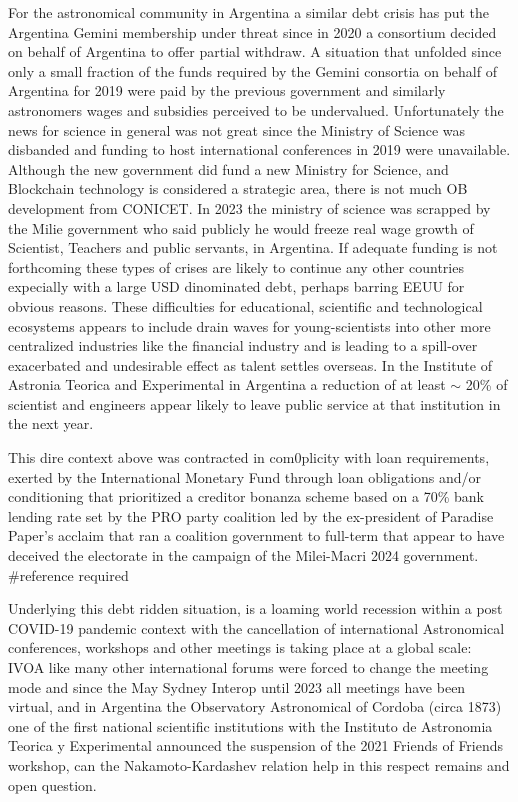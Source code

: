 \documentclass[final,5p,times,twocolumn,authoryear]{elsarticle}
\begin{document}
For the astronomical community in Argentina a similar debt crisis has put the Argentina Gemini membership under threat since in 2020 a consortium decided on behalf of Argentina to offer partial withdraw. A situation that unfolded since only a small fraction of the funds required by the Gemini consortia on behalf of Argentina for 2019 were paid by the previous government and similarly astronomers wages and subsidies perceived to be undervalued. Unfortunately the news for science in general was not great since the Ministry of Science was disbanded and funding to host international conferences in 2019 were unavailable. Although the new government did fund a new Ministry for Science, and Blockchain technology is considered a strategic area, there is not much OB development from CONICET. In 2023 the ministry of science was scrapped by the Milie government who said publicly he would freeze real wage growth of Scientist, Teachers and public servants, in Argentina. If adequate funding is not forthcoming these types of crises are likely to continue any other countries expecially with a large USD dinominated debt, perhaps barring EEUU for obvious reasons. These difficulties for educational, scientific and technological ecosystems appears to include drain waves for young-scientists into other more centralized industries like the financial industry and is leading to a spill-over exacerbated and undesirable effect as talent settles overseas. In the Institute of Astronia Teorica and Experimental in Argentina a reduction of at least $\sim$ 20\% of scientist and engineers appear likely to leave public service at that institution in the next year.

This dire context above was contracted in com0plicity with loan requirements, exerted by the International Monetary Fund through loan obligations and/or conditioning that prioritized a creditor bonanza scheme based on a 70\% bank lending rate set by the PRO party coalition led by the ex-president of Paradise Paper's acclaim that ran a coalition government to full-term that appear to have deceived the electorate in the campaign of the Milei-Macri 2024 government. #reference required

Underlying this debt ridden situation, is a loaming world recession within a post COVID-19 pandemic context with the cancellation of international Astronomical conferences, workshops and other meetings is taking place at a global scale: IVOA like many other international forums were forced to change the meeting mode and since the May Sydney Interop until 2023 all meetings have been virtual, and in Argentina the Observatory Astronomical of Cordoba (circa 1873) one of the first national scientific institutions with the Instituto de Astronomia Teorica y Experimental announced the suspension of the 2021 Friends of Friends workshop, can the Nakamoto-Kardashev relation help in this respect remains and open question.  
\end{document}
